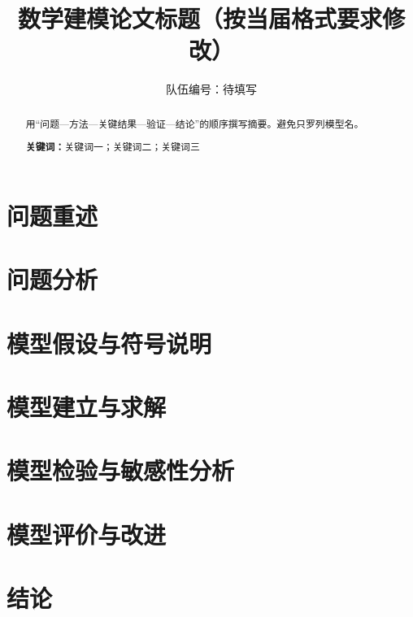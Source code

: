 \documentclass[UTF8,fontset=fandol,a4paper,12pt]{ctexart}
\title{数学建模论文标题（按当届格式要求修改）}
\author{队伍编号：待填写}
\date{}
\begin{document}
\maketitle

\begin{abstract}
用“问题—方法—关键结果—验证—结论”的顺序撰写摘要。避免只罗列模型名。

\textbf{关键词：}关键词一；关键词二；关键词三
\end{abstract}

\section{问题重述}

\section{问题分析}

\section{模型假设与符号说明}

\section{模型建立与求解}

\section{模型检验与敏感性分析}

\section{模型评价与改进}

\section{结论}

% 
% 
\end{document}
